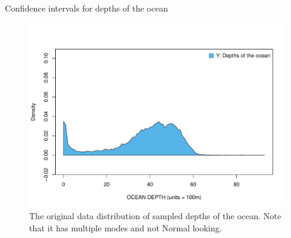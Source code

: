 \documentclass{beamer}\usepackage[]{graphicx}\usepackage[]{color}
\newenvironment{knitrout}{}{} %
\begin{document}
\begin{frame}[fragile]{Confidence intervals for depths of the ocean}

\vspace*{-0.19in}


\begin{knitrout}\scriptsize
{}\color{fgcolor}\begin{figure}

{\centering \includegraphics[width=1\linewidth]{figure/unnamed-chunk-2-1} 

}

\caption[The original data distribution of sampled depths of the ocean]{The original data distribution of sampled depths of the ocean. Note that it has multiple modes and not Normal looking.}\label{fig:unnamed-chunk-2}
\end{figure}


\end{knitrout}


\end{frame}
\end{document}
